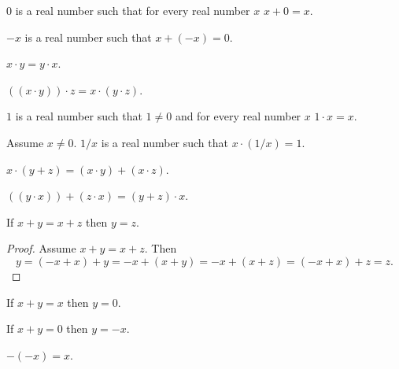 \documentclass{article}
\begin{document}
\begin{forthel}
\begin{signature}[1 12 A4]
$0$ is a real number such that
for every real number $x$ $x + 0 = x$.
\end{signature}

\begin{signature}[1 12 A5]
$-x$ is a real number such that $x + (-x) = 0$.
\end{signature}

\begin{axiom}[1 12 M2]
$x \cdot y = y \cdot x$.
\end{axiom}

\begin{axiom}[1 12 M3]
$((x \cdot y)) \cdot z = x \cdot (y \cdot z)$.
\end{axiom}

\begin{signature}[1 12 M4]
$1$ is a real number such that $1 \neq 0$ and
for every real number $x$ $1 \cdot x = x$.
\end{signature}

\begin{signature}[1 12 M5]
Assume $x \neq 0$. $1/x$ is a real number
such that $x \cdot (1/x) = 1$.
\end{signature}

\begin{axiom}[1 12 D]
$x \cdot (y + z) = (x \cdot y) + (x \cdot z)$.
\end{axiom}

\begin{proposition}[Dist1]
$((y \cdot x)) + (z \cdot x) = (y + z) \cdot x$.
\end{proposition}

\begin{proposition}[1 14 a]
If $x + y = x + z$ then $y = z$.
\end{proposition}
\begin{proof}
Assume $x + y = x + z$.
Then \[ y = (-x+x) + y = -x + (x+y) = -x + (x+z) = (-x+x) + z = z. \]
\end{proof}

\begin{proposition}[1 14 b]
If $x + y = x$ then $y = 0$.
\end{proposition}

\begin{proposition}[1 14 c]
If $x + y = 0$ then $y = -x$.
\end{proposition}

\begin{proposition}[1 14 d]
$-(-x) = x$.
\end{proposition}



\end{forthel}
\end{document}
